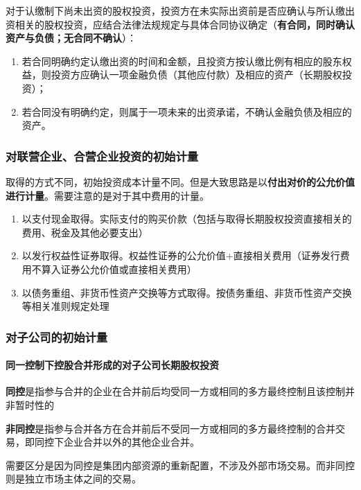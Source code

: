 \documentclass[UTF8,12pt]{ctexart}
\numberwithin{equation}{section} %
\numberwithin{figure}{section}
\numberwithin{table}{section}
\begin{document}
	
	对于认缴制下尚未出资的股权投资，投资方在未实际出资前是否应确认与所认缴出资相关的股权投资，应结合法律法规规定与具体合同协议确定（\textbf{有合同，同时确认资产与负债；无合同不确认}）：
	\begin{enumerate}
		\item 若合同明确约定认缴出资的时间和金额，且投资方按认缴比例有相应的股东权益，则投资方应确认一项金融负债（其他应付款）及相应的资产（长期股权投资）；
		
		\item 若合同没有明确约定，则属于一项未来的出资承诺，不确认金融负债及相应的资产。
	\end{enumerate}

	\subsubsection{对联营企业、合营企业投资的初始计量}
	取得的方式不同，初始投资成本计量不同。但是大致思路是以\textbf{付出对价的公允价值进行计量}。需要注意的是对于其中费用的计量。
	\begin{enumerate}
		\item 以支付现金取得。实际支付的购买价款（包括与取得长期股权投资直接相关的费用、税金及其他必要支出）
		
		\item 以发行权益性证券取得。权益性证券的公允价值+直接相关费用（证券发行费用不算入证券公允价值或直接相关费用）
		
		\item 以债务重组、非货币性资产交换等方式取得。按债务重组、非货币性资产交换等相关准则规定处理
	\end{enumerate}
	
	\subsubsection{对子公司的初始计量}
	\paragraph{同一控制下控股合并形成的对子公司长期股权投资}
	
	\textbf{同控}是指参与合并的企业在合并前后均受同一方或相同的多方最终控制且该控制并非暂时性的
	
	\textbf{非同控}是指参与合并各方在合并前后不受同一方或相同的多方最终控制的合并交易，即同控下企业合并以外的其他企业合并。
	
	需要区分是因为同控是集团内部资源的重新配置，不涉及外部市场交易。而非同控则是独立市场主体之间的交易。
	
\end{document}
